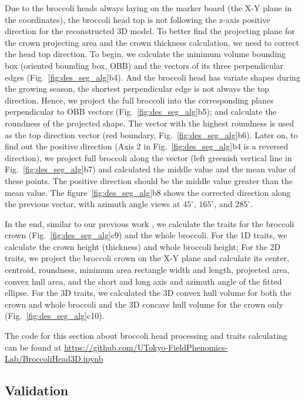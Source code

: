 Due to the broccoli heads always laying on the marker board (the X-Y plane in the coordinates), the broccoli head top is not following the z-axis positive direction for the reconstructed 3D model. To better find the projecting plane for the crown projecting area and the crown thickness calculation, we need to correct the head top direction. To begin, we calculate the minimum volume bounding box (oriented bounding box, OBB) and the vectors of its three perpendicular edges (Fig.~\ref{fig:des_seg_alg}b4). And the broccoli head has variate shapes during the growing season, the shortest perpendicular edge is not always the top direction. Hence, we project the full broccoli into the corresponding planes perpendicular to OBB vectors (Fig.~\ref{fig:des_seg_alg}b5); and calculate the roundness of the projected shape. The vector with the highest roundness is used as the top direction vector (red boundary, Fig.~\ref{fig:des_seg_alg}b6). Later on, to find out the positive direction (Axis 2 in Fig.~\ref{fig:des_seg_alg}b4 is a reversed direction), we project full broccoli along the vector (left greenish vertical line in Fig.~\ref{fig:des_seg_alg}b7) and calculated the middle value and the mean value of these points. The positive direction should be the middle value greater than the mean value. The figure~\ref{fig:des_seg_alg}b8 shows the corrected direction along the previous vector, with azimuth angle views at $45^\circ$, $165^\circ$, and $285^\circ$.

In the end, similar to our previous work \citep{feldman_easydcp_2021}, we calculate the traits for the broccoli crown (Fig.~\ref{fig:des_seg_alg}c9) and the whole broccoli. For the 1D traits, we calculate the crown height (thickness) and whole broccoli height; For the 2D traits, we project the broccoli crown on the X-Y plane and calculate its center, centroid, roundness, minimum area rectangle width and length, projected area, convex hull area, and the short and long axis and azimuth angle of the fitted ellipse. For the 3D traits, we calculated the 3D convex hull volume for both the crown and whole broccoli and the 3D concave hull volume for the crown only (Fig.~\ref{fig:des_seg_alg}c10). 

The code for this section about broccoli head processing and traits calculating can be found at \url{https://github.com/UTokyo-FieldPhenomics-Lab/BroccoliHead3D.ipynb}

\subsection{Validation}

